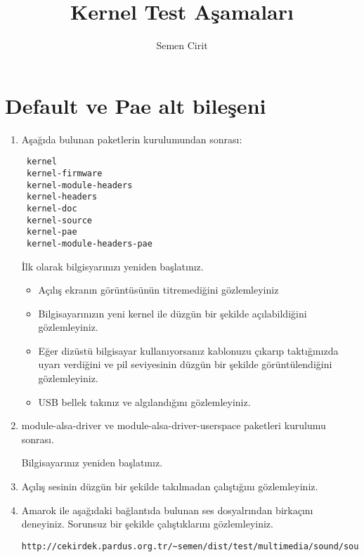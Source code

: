 \documentclass[a4paper,10pt]{article}
\title{Kernel Test Aşamaları}
\author{Semen Cirit}
\begin{document}
\maketitle

\section{Default ve Pae alt bileşeni}
\begin{enumerate}
 \item  Aşağıda bulunan paketlerin kurulumundan sonrası:
 \begin{verbatim}
 kernel
 kernel-firmware
 kernel-module-headers
 kernel-headers
 kernel-doc
 kernel-source 
 kernel-pae
 kernel-module-headers-pae
\end{verbatim}

İlk olarak bilgisyarınızı yeniden başlatınız.
\begin{itemize}
\item Açılış ekranın görüntüsünün titremediğini gözlemleyiniz
\item Bilgisayarınızın yeni kernel ile düzgün bir şekilde açılabildiğini gözlemleyiniz.
\item Eğer dizüstü bilgisayar kullanıyorsanız kablonuzu çıkarıp taktığınızda uyarı verdiğini ve pil seviyesinin düzgün bir şekilde görüntülendiğini gözlemleyiniz.
\item USB bellek takınız ve algılandığını gözlemleyiniz.
\end{itemize}

\item module-alsa-driver ve module-alsa-driver-userspace paketleri kurulumu sonrası.

Bilgisayarınız yeniden başlatınız.
\item Açılış sesinin düzgün bir şekilde takılmadan çalıştığını gözlemleyiniz.

\item Amarok ile aşağıdaki bağlantıda bulunan ses dosyalrından birkaçını deneyiniz. Sorunsuz bir şekilde çalıştıklarını gözlemleyiniz.
\begin{verbatim}
http://cekirdek.pardus.org.tr/~semen/dist/test/multimedia/sound/sound.tar 
\end{verbatim}

\end{enumerate}
\end{document}
